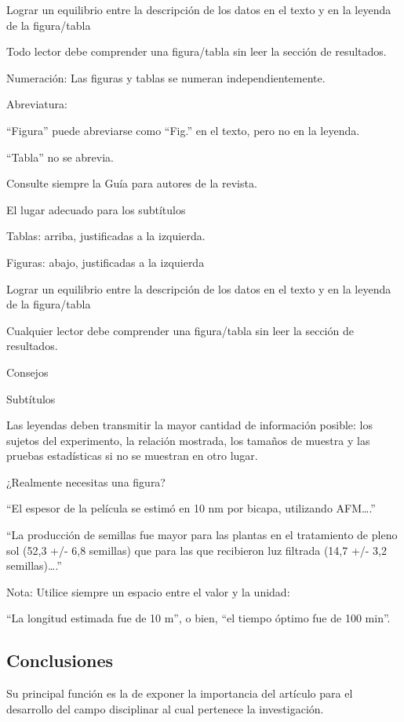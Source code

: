 \documentclass[a4paper,12pt]{article}
\begin{document}
Lograr un equilibrio entre la descripción de los datos en el texto y en la leyenda de la figura/tabla

Todo lector debe comprender una figura/tabla sin leer la sección de resultados.

Numeración: Las figuras y tablas se numeran independientemente.

Abreviatura:

“Figura” puede abreviarse como “Fig.” en el texto, pero no en la leyenda.

“Tabla” no se abrevia.

Consulte siempre la Guía para autores de la revista.

El lugar adecuado para los subtítulos

Tablas: arriba, justificadas a la izquierda.

Figuras: abajo, justificadas a la izquierda

Lograr un equilibrio entre la descripción de los datos en el texto y en la leyenda de la figura/tabla

Cualquier lector debe comprender una figura/tabla sin leer la sección de resultados.

Consejos

Subtítulos

Las leyendas deben transmitir la mayor cantidad de información posible: los sujetos del experimento, la relación mostrada, los tamaños de muestra y las pruebas estadísticas si no se muestran en otro lugar.

¿Realmente necesitas una figura?

“El espesor de la película se estimó en 10 nm por bicapa, utilizando AFM….”

“La producción de semillas fue mayor para las plantas en el tratamiento de pleno sol (52,3 +/- 6,8 semillas) que para las que recibieron luz filtrada (14,7 +/- 3,2 semillas)….”

Nota: Utilice siempre un espacio entre el valor y la unidad:

“La longitud estimada fue de 10 m”, o bien, “el tiempo óptimo fue de 100 min”.

\subsection{Conclusiones}

Su principal función es la de exponer la importancia del artículo para el desarrollo del campo disciplinar al cual pertenece la investigación.
\end{document}

